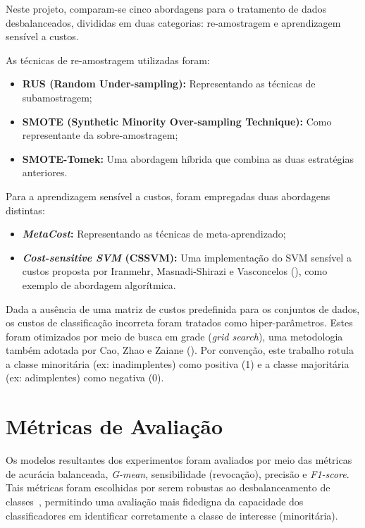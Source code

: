 Neste projeto, comparam-se cinco abordagens para o tratamento de dados desbalanceados, divididas em duas categorias: re-amostragem e aprendizagem sensível a custos.

As técnicas de re-amostragem utilizadas foram:
\begin{itemize}
  \item \textbf{RUS (Random Under-sampling):} Representando as técnicas de subamostragem;
  \item \textbf{SMOTE (Synthetic Minority Over-sampling Technique):} Como representante da sobre-amostragem;
  \item \textbf{SMOTE-Tomek:} Uma abordagem híbrida que combina as duas estratégias anteriores.
\end{itemize}
Para a aprendizagem sensível a custos, foram empregadas duas abordagens distintas:
\begin{itemize}
  \item \textbf{\textit{MetaCost}:} Representando as técnicas de meta-aprendizado;
  \item \textbf{\textit{Cost-sensitive SVM} (CSSVM):} Uma implementação do SVM sensível a custos proposta por Iranmehr, Masnadi-Shirazi e Vasconcelos (\citeyear{Iranmehr2019}), como exemplo de abordagem algorítmica.
\end{itemize}

Dada a ausência de uma matriz de custos predefinida para os conjuntos de dados, os custos de classificação incorreta foram tratados como hiper-parâmetros. Estes foram otimizados por meio de busca em grade (\textit{grid search}), uma metodologia também adotada por Cao, Zhao e Zaiane (\citeyear{Cao2013}). Por convenção, este trabalho rotula a classe minoritária (ex: inadimplentes) como positiva (1) e a classe majoritária (ex: adimplentes) como negativa (0).

\section{Métricas de Avaliação}\label{sec:metricas}

Os modelos resultantes dos experimentos foram avaliados por meio das métricas de acurácia balanceada, \textit{G-mean}, sensibilidade (revocação), precisão e \textit{F1-score}. Tais métricas foram escolhidas por serem robustas ao desbalanceamento de classes~\cite{Namvar2018,Wei2025}, permitindo uma avaliação mais fidedigna da capacidade dos classificadores em identificar corretamente a classe de interesse (minoritária).

